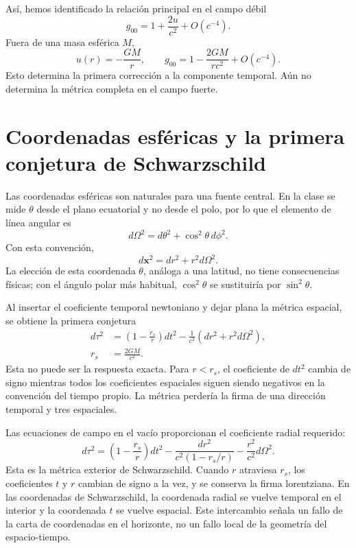Así, hemos identificado la relación principal en el campo débil
\begin{equation}
g_{00}=1+\frac{2u}{c^2}+O(c^{-4}).
\label{eq:l5-g00-newton}
\end{equation}
Fuera de una masa esférica \(M\),
\begin{equation}
u(r)=-\frac{GM}{r},
\qquad
g_{00}=1-\frac{2GM}{rc^2}+O(c^{-4}).
\label{eq:l5-g00-spherical}
\end{equation}
Esto determina la primera corrección a la componente temporal. Aún no determina la métrica completa en el campo fuerte.

\section{Coordenadas esféricas y la primera conjetura de Schwarzschild}

Las coordenadas esféricas son naturales para una fuente central. En la clase se mide \(\theta\) desde el plano ecuatorial y no desde el polo, por lo que el elemento de línea angular es
\begin{equation}
d\Omega^2=d\theta^2+\cos^2\theta\,d\phi^2.
\label{eq:l5-angular-metric}
\end{equation}
Con esta convención,
\begin{equation}
d\mathbf{x}^2=dr^2+r^2d\Omega^2.
\label{eq:l5-flat-spherical}
\end{equation}
La elección de esta coordenada \(\theta\), análoga a una latitud, no tiene consecuencias físicas; con el ángulo polar más habitual, \(\cos^2\theta\) se sustituiría por \(\sin^2\theta\).

Al insertar el coeficiente temporal newtoniano y dejar plana la métrica espacial, se obtiene la primera conjetura
\begin{equation}
\begin{aligned}
d\tau^2
&=\left(1-\frac{r_s}{r}\right)dt^2
-\frac{1}{c^2}\left(dr^2+r^2d\Omega^2\right),\\
r_s&=\frac{2GM}{c^2}.
\end{aligned}
\label{eq:l5-naive-schwarzschild}
\end{equation}
Esta no puede ser la respuesta exacta. Para \(r<r_s\), el coeficiente de \(dt^2\) cambia de signo mientras todos los coeficientes espaciales siguen siendo negativos en la convención del tiempo propio. La métrica perdería la firma de una dirección temporal y tres espaciales.

Las ecuaciones de campo en el vacío proporcionan el coeficiente radial requerido:
\begin{equation}
\boxed{
d\tau^2
=\left(1-\frac{r_s}{r}\right)dt^2
-\frac{dr^2}{c^2\left(1-r_s/r\right)}
-\frac{r^2}{c^2}d\Omega^2.
}
\label{eq:l5-schwarzschild}
\end{equation}
Esta es la métrica exterior de Schwarzschild. Cuando \(r\) atraviesa \(r_s\), los coeficientes \(t\) y \(r\) cambian de signo a la vez, y se conserva la firma lorentziana. En las coordenadas de Schwarzschild, la coordenada radial se vuelve temporal en el interior y la coordenada \(t\) se vuelve espacial. Este intercambio señala un fallo de la carta de coordenadas en el horizonte, no un fallo local de la geometría del espacio-tiempo.

